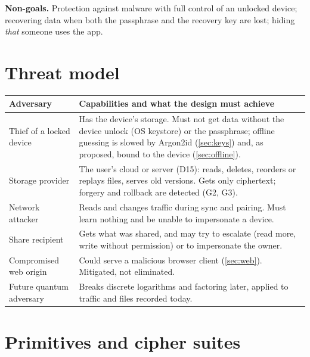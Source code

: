 \documentclass[11pt,a4paper]{article}
\newcommand{\dref}[1]{\textsf{#1}} %
\begin{document}
\noindent\textbf{Non-goals.} Protection against malware with full control of an unlocked device; recovering data when both the passphrase and the recovery key are lost; hiding \emph{that} someone uses the app.

\section{Threat model}

\begin{tabularx}{\textwidth}{@{}lX@{}}
\toprule
Adversary & Capabilities and what the design must achieve \\
\midrule
Thief of a locked device & Has the device's storage. Must not get data without the device unlock (OS keystore) or the passphrase; offline guessing is slowed by Argon2id (\cref{sec:keys}) and, as proposed, bound to the device (\cref{sec:offline}). \\
Storage provider & The user's cloud or server (\dref{D15}): reads, deletes, reorders or replays files, serves old versions. Gets only ciphertext; forgery and rollback are detected (G2, G3). \\
Network attacker & Reads and changes traffic during sync and pairing. Must learn nothing and be unable to impersonate a device. \\
Share recipient & Gets what was shared, and may try to escalate (read more, write without permission) or to impersonate the owner. \\
Compromised web origin & Could serve a malicious browser client (\cref{sec:web}). Mitigated, not eliminated. \\
Future quantum adversary & Breaks discrete logarithms and factoring later, applied to traffic and files recorded today. \\
\bottomrule
\end{tabularx}

\section{Primitives and cipher suites}
\label{sec:suites}
\end{document}
